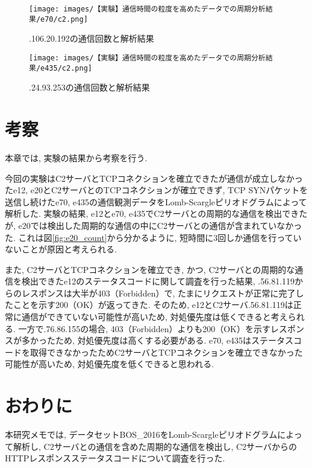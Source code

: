 \documentclass[twocolumn,9pt]{ltjsarticle}
\begin{document}
\begin{figure}[htbp]
    \centering

    \texttt{[image: images/【実験】通信時間の粒度を高めたデータでの周期分析結果/e70/c2.png]}

    \caption{\ast\ast\ast.106.20.192の通信回数と解析結果}
    \label{fig:e70_result}
\end{figure}

\begin{figure}[htbp]
    \centering

    \texttt{[image: images/【実験】通信時間の粒度を高めたデータでの周期分析結果/e435/c2.png]}

    \caption{\ast\ast\ast.24.93.253の通信回数と解析結果}
    \label{fig:e435_result}
\end{figure}

\section{考察}
本章では, 実験の結果から考察を行う. 

今回の実験はC2サーバとTCPコネクションを確立できたが通信が成立しなかったe12, e20とC2サーバとのTCPコネクションが確立できず, TCP SYNパケットを送信し続けたe70, e435の通信観測データをLomb-Scargleピリオドグラムによって解析した. 実験の結果, e12とe70, e435でC2サーバとの周期的な通信を検出できたが, e20では検出した周期的な通信の中にC2サーバとの通信が含まれていなかった. これは図\ref{fig:e20_count}から分かるように, 短時間に3回しか通信を行っていないことが原因と考えられる. 

また, C2サーバとTCPコネクションを確立でき, かつ, C2サーバとの周期的な通信を検出できたe12のステータスコードに関して調査を行った結果, \ast\ast\ast.56.81.119からのレスポンスは大半が403（Forbidden）で, たまにリクエストが正常に完了したことを示す200（OK）が返ってきた. そのため, e12とC2サーバ\ast\ast\ast.56.81.119は正常に通信ができていない可能性が高いため, 対処優先度は低くできると考えられる. 一方で\ast\ast\ast.76.86.155の場合, 403（Forbidden）よりも200（OK）を示すレスポンスが多かったため, 対処優先度は高くする必要がある. e70, e435はステータスコードを取得できなかったためC2サーバとTCPコネクションを確立できなかった可能性が高いため, 対処優先度を低くできると思われる. 

\section{おわりに}
本研究メモでは, データセットBOS\_2016をLomb-Scargleピリオドグラムによって解析し, C2サーバとの通信を含めた周期的な通信を検出し, C2サーバからのHTTPレスポンスステータスコードについて調査を行った. 
\end{document}
